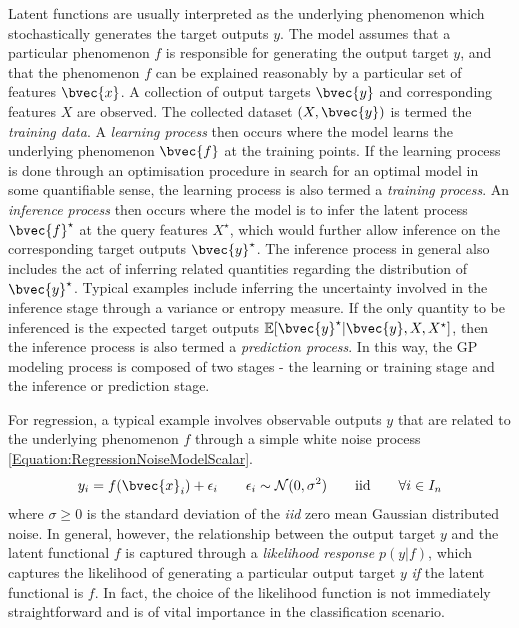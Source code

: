 				Latent functions are usually interpreted as the underlying phenomenon which stochastically generates the target outputs $y$.  The model assumes that a particular phenomenon $f$ is responsible for generating the output target $y$, and that the phenomenon $f$ can be explained reasonably by a particular set of features $\bvec{x}$. A collection of output targets $\bvec{y}$ and corresponding features $X$ are observed. The collected dataset $(X, \bvec{y})$ is termed the \textit{training data}. A \textit{learning process} then occurs where the model learns the underlying phenomenon $\bvec{f}$ at the training points. If the learning process is done through an optimisation procedure in search for an optimal model in some quantifiable sense, the learning process is also termed a \textit{training process}. An \textit{inference process} then occurs where the model is to infer the latent process $\bvec{f}^{\star}$ at the query features $X^{\star}$, which would further allow inference on the corresponding target outputs $\bvec{y}^{\star}$. The inference process in general also includes the act of inferring related quantities regarding the distribution of $\bvec{y}^{\star}$. Typical examples include inferring the uncertainty involved in the inference stage through a variance or entropy measure. If the only quantity to be inferenced is the expected target outputs $\mathbb{E}[\bvec{y}^{\star} | \bvec{y}, X, X^{\star}]$, then the inference process is also termed a \textit{prediction process}. In this way, the GP modeling process is composed of two stages - the learning or training stage and the inference or prediction stage.
				
				For regression, a typical example involves observable outputs $y$ that are related to the underlying phenomenon $f$ through a simple white noise process \eqref{Equation:RegressionNoiseModelScalar}. \begin{equation}
					y_{i} = f(\bvec{x}_{i}) + \epsilon_{i} \qquad \epsilon_{i} \sim \mathcal{N}(0, \sigma^{2}) \qquad \mathrm{iid} \qquad \forall i \in I_{n}
				\label{Equation:RegressionNoiseModelScalar}
				\end{equation} where $\sigma \geq 0$ is the standard deviation of the \textit{iid} zero mean Gaussian distributed noise. In general, however, the relationship between the output target $y$ and the latent functional $f$ is captured through a \textit{likelihood response} $p(y | f)$, which captures the likelihood of generating a particular output target $y$ \textit{if} the latent functional is $f$. In fact, the choice of the likelihood function is not immediately straightforward and is of vital importance in the classification scenario. 
				
